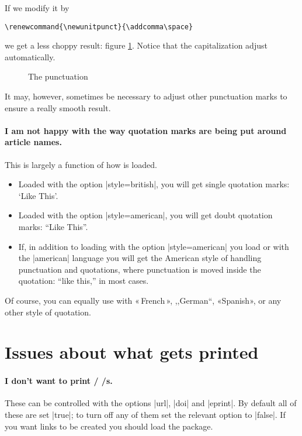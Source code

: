 If we modify it by
\begin{Verbatim}
\renewcommand{\newunitpunct}{\addcomma\space}
\end{Verbatim}
we get a less choppy result: figure \ref{punctcite11}. Notice that the
capitalization adjust automatically.\begin{figure}
\caption{The  punctuation\label{punctcite11}}
\end{figure} It may, however, sometimes be necessary to adjust other
punctuation marks to ensure a really smooth result.

\paragraph{I am not happy with the way quotation marks are being put
  around article names.} This is largely a function of how
 is loaded.
\begin{itemize}
\item Loaded with the option |style=british|, you will get single
   quotation marks: `Like This'.
\item Loaded with the option |style=american|, you will get doubt
   quotation marks: ``Like This''.
\item If, in addition to loading  with the option
   |style=american| you load  or  with the
   |american| language you will get the American style of handling punctuation
   and quotations, where punctuation is moved inside the quotation:
   ``like this,'' in most cases.
\end{itemize}
Of course, you can equally use  with «\,French\,»,
,,German``, «Spanish», or any other style of quotation.


\section{Issues about what gets printed}

\paragraph{I don't want to print \slash
  \slash {}s.} These can be controlled
with the options |url|, |doi| and |eprint|. By default all of these
are set |true|; to turn off any of them set the relevant option to
|false|. If you want links to be created you should load the
 package.

